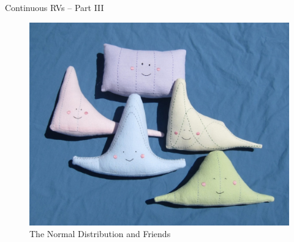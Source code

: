\documentclass[handout]{beamer}
\date{Lecture \# 12}
\begin{document}
 


\begin{frame}[plain]
	\titlepage 
	

\end{frame} 

\begin{frame}
\Huge \begin{center}
Continuous RVs -- Part III
\end{center}
\end{frame}
\begin{frame}
\begin{figure}
\includegraphics[scale = 0.2]{./images/normal_friends}
\caption{The Normal Distribution and Friends}
\end{figure}
\end{frame}
\end{document}
